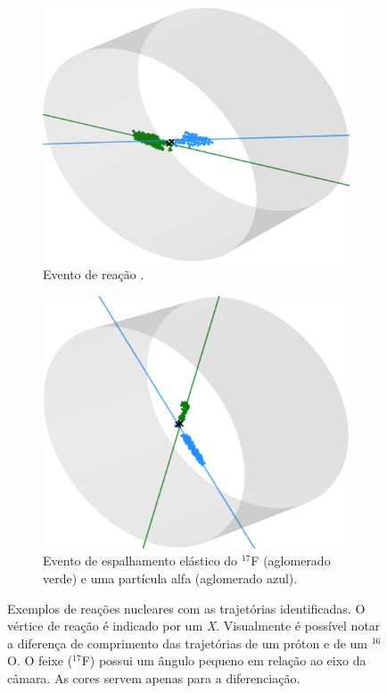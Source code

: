 \documentclass[a4paper,12pt,oneside]{book}
\begin{document}
\begin{figure}[H]
\centering
    \begin{subfigure}[t]{0.45\textwidth}
        \centering
        \includegraphics[scale=0.5, width=.95\columnwidth]{figs/reac_alpha_alpha_num_177.png}
        \caption{Evento de reação .}
        \label{subfig:exemplo_alpha_alpha}
    \end{subfigure}%
    \hspace{0.5cm}
    \begin{subfigure}[t]{0.45\textwidth}
        \centering
        \includegraphics[scale=0.5, width=.95\columnwidth]{figs/espalhamento_17F_alpha_num_212.png}
        \caption{Evento de espalhamento elástico do $^{17}$F (aglomerado verde) e uma partícula alfa (aglomerado azul).}
        \label{subfig:exemplo_scatt_17F_alpha}
    \end{subfigure}
\caption{Exemplos de reações nucleares com as trajetórias identificadas. O vértice de reação é indicado por um \textit{X}. Visualmente é possível notar a diferença de comprimento das trajetórias de um próton e de um $^{16}$O. O feixe ($^{17}$F) possui um ângulo pequeno em relação ao eixo da câmara. As cores servem apenas para a diferenciação.}
\label{fig:exemplos_tracks_diff}
\end{figure}
\end{document}
